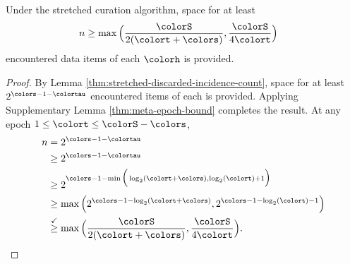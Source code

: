 \begin{corollary}
\label{thm:stretched-reservation-count}
Under the stretched curation algorithm, space for at least
\begin{align*}
n &\geq
\max\Big(
  \frac{\colorS}{2(\colort + \colors)},
  \frac{\colorS}{4\colort}
\Big)
\end{align*}
encountered data items of each \hv{} $\colorh$ is provided.
\end{corollary}
\begin{proof}

By Lemma \ref{thm:stretched-discarded-incidence-count}, space for at least $2^{\colors - 1 - \colortau}$ encountered items of each \hv{} is provided.
Applying Supplementary Lemma \ref{thm:meta-epoch-bound} completes the result.
At any epoch $1 \leq \colort \leq \colorS - \colors$,
\begin{align*}
n
&= 2^{\colors - 1 - \colortau}\\
&\geq 2^{\colors - 1 - \colortau}\\
&\geq2^{\colors - 1 - \min\Big(
  \log_2(\colort + \colors),
  \log_2(\colort) + 1
\Big)}\\
&\geq \max\Big(
  2^{\colors - 1 - \log_2(\colort + \colors)},
  2^{\colors - 1 - \log_2(\colort) - 1}
\Big)\\
&\stackrel{\checkmark}{\geq} \max\Big(
  \frac{\colorS}{2(\colort + \colors)},
  \frac{\colorS}{4\colort}
\Big).
\end{align*}

\end{proof}
